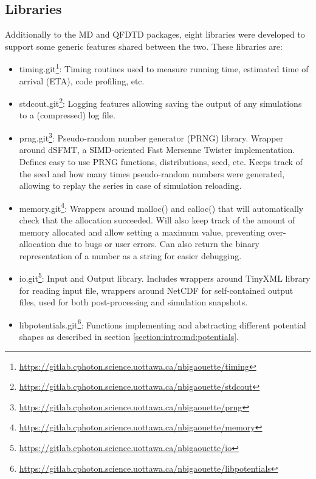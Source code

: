 \subsection{Libraries}
\label{section:tools:libraries}

Additionally to the MD and QFDTD packages, eight libraries were developed to
support some generic features shared between the two. These libraries are:
\begin{itemize}
\item timing.git\footnote{ \url{
    https://gitlab.cphoton.science.uottawa.ca/nbigaouette/timing}}:
    Timing routines used to measure running time, estimated time of arrival
    (ETA), code profiling, etc.
\item stdcout.git\footnote{ \url{
    https://gitlab.cphoton.science.uottawa.ca/nbigaouette/stdcout}}:
    Logging features allowing saving the output of any simulations to a
    (compressed) log file.
\item prng.git\footnote{ \url{
    https://gitlab.cphoton.science.uottawa.ca/nbigaouette/prng}}:
    Pseudo-random number generator (PRNG) library. Wrapper around
    dSFMT\cite{prng2009}, a SIMD-oriented Fast Mersenne Twister implementation.
    Defines easy to use PRNG functions, distributions, seed, etc. Keeps track of
    the seed and how many times pseudo-random numbers were generated, allowing
    to replay the series in case of simulation reloading.
\item memory.git\footnote{ \url{
    https://gitlab.cphoton.science.uottawa.ca/nbigaouette/memory}}:
    Wrappers around malloc() and calloc() that will automatically check that
    the allocation succeeded. Will also keep track of the amount of
    memory allocated and allow setting a maximum value, preventing
    over-allocation due to bugs or user errors. Can also return the binary
    representation of a number as a string for easier debugging.
\item io.git\footnote{ \url{
    https://gitlab.cphoton.science.uottawa.ca/nbigaouette/io}}:
    Input and Output library. Includes wrappers around TinyXML library\cite{tinyxml} for
    reading input file, wrappers around NetCDF\cite{netcdf} for self-contained
    output files, used for both post-processing and simulation snapshots.
\item libpotentials.git\footnote{ \url{
    https://gitlab.cphoton.science.uottawa.ca/nbigaouette/libpotentials}}:
    Functions implementing and abstracting different potential shapes as
    described in section \ref{section:intro:md:potentials}.

\end{itemize}
